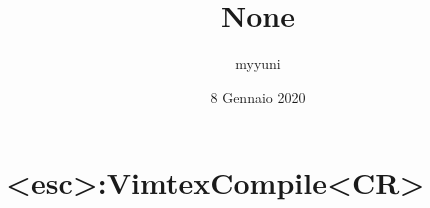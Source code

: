 \documentclass[12pt, a4paper]{article}
\date{8 Gennaio 2020}
\title{None}
\author{myyuni}
\begin{document}
\maketitle

\section{<esc>:VimtexCompile<CR>}
\end{document}
